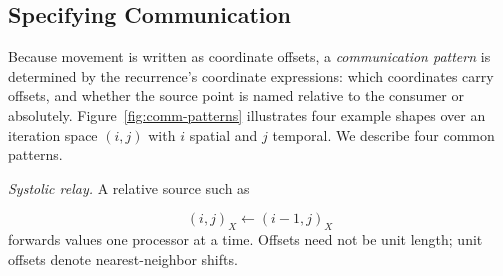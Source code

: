 \documentclass[sigplan, nonacm]{acmart}
\begin{document}


\subsection{Specifying Communication}
\label{sec:communication}


Because movement is written as coordinate offsets, a \emph{communication
pattern} is determined by the recurrence's coordinate expressions:
which coordinates carry offsets, and whether the source point is named
relative to the consumer or absolutely. Figure~\ref{fig:comm-patterns}
illustrates four example shapes over an iteration space $(i,j)$ with $i$
spatial and $j$ temporal. We describe four common patterns.

\emph{Systolic relay.} A relative source such as

\begin{equation}
 (i,j)_X \leftarrow (i-1,j)_X 
\end{equation}
forwards values one processor at a time. Offsets need not be unit length; unit offsets denote nearest-neighbor shifts.
\end{document}

